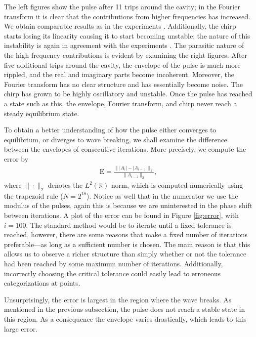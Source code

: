 \documentclass[10pt,twocolumn,a4paper]{article}
\begin{document}
The left figures show the pulse after 11 trips around the cavity; in the Fourier transform it is clear that the contributions from higher frequencies has increased. We obtain comparable results as in the experiments \cite{anderson, rothenberg}. Additionally, the chirp starts losing its linearity causing it to start becoming unstable; the nature of this instability is again in agreement with the experiments \cite{anderson, rothenberg}. The parasitic nature of the high frequency contributions is evident by examining the right figures. After five additional trips around the cavity, the envelope of the pulse is much more rippled, and the real and imaginary parts become incoherent. Moreover, the Fourier transform has no clear structure and has essentially become noise. The chirp has grown to be highly oscillatory and unstable. Once the pulse has reached a state such as this, the envelope, Fourier transform, and chirp never reach a steady equilibrium state.




To obtain a better understanding of how the pulse either converges to equilibrium, or diverges to wave breaking, we shall examine the difference between the envelopes of consecutive iterations. More precisely, we compute the error by
\begin{align}
	\textrm{E} = \frac{\| |A_i| - |A_{i-1}| \|_2}{\| A_{i-1} \|_2},
	\label{eq:error}
\end{align}
where $\| \cdot \|_2$ denotes the $L^2(\mathbb{R})$ norm, which is computed numerically using the trapezoid rule ($N = 2^{18}$). Notice as well that in the numerator we use the modulus of the pulses, again this is because we are uninterested in the phase shift between iterations. A plot of the error can be found in Figure \ref{fig:error}, with $i = 100$. The standard method would be to iterate until a fixed tolerance is reached, however, there are some reasons that make a fixed number of iterations preferable---as long as a sufficient number is chosen. The main reason is that this allows us to observe a richer structure than simply whether or not the tolerance had been reached by some maximum number of iterations. Additionally, incorrectly choosing the critical tolerance could easily lead to erroneous categorizations at points.

Unsurprisingly, the error is largest in the region where the wave breaks. As mentioned in the previous subsection, the pulse does not reach a stable state in this region. As a consequence the envelope varies drastically, which leads to this large error.
\end{document}
